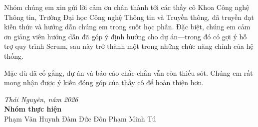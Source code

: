 \documentclass[../main.tex]{subfiles}
\begin{document}
Nhóm chúng em xin gửi lời cảm ơn chân thành tới các thầy cô Khoa Công nghệ Thông tin, Trường Đại
học Công nghệ Thông tin và Truyền thông, đã truyền đạt kiến thức và hướng dẫn chúng em trong suốt
học phần. Đặc biệt, chúng em cảm ơn giảng viên hướng dẫn đã góp ý định hướng cho dự án---trong đó
có gợi ý hỗ trợ quy trình Scrum, sau này trở thành một trong những chức năng chính của hệ thống.

Mặc dù đã cố gắng, dự án và báo cáo chắc chắn vẫn còn thiếu sót. Chúng em rất mong nhận được ý
kiến đóng góp của thầy cô để hoàn thiện hơn.

\vspace{1cm}
\begin{flushright}
\textit{Thái Nguyên, năm 2026}\\
\textbf{Nhóm thực hiện}\\
Phạm Văn Huynh \quad Đàm Đức Đôn \quad Phạm Minh Tú
\end{flushright}
\end{document}
